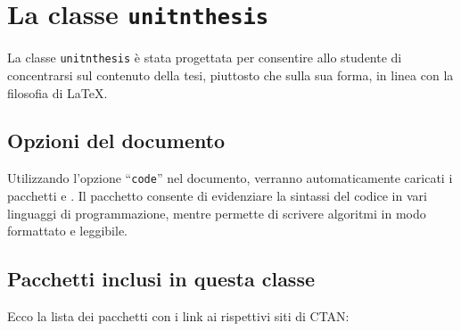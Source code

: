 \chapter{La classe \texttt{unitnthesis}}

La classe \texttt{unitnthesis} è stata progettata per consentire allo studente di concentrarsi sul contenuto della tesi, piuttosto che sulla sua forma, in linea con la 
filosofia di \LaTeX.

\section{Opzioni del documento}

Utilizzando l'opzione \enquote{\texttt{code}} nel documento, verranno automaticamente caricati i pacchetti  e . Il pacchetto  consente di evidenziare la sintassi del codice in vari linguaggi di programmazione, mentre  permette di scrivere algoritmi in modo formattato e leggibile.

\section{Pacchetti inclusi in questa classe}

Ecco la lista dei pacchetti con i link ai rispettivi siti di CTAN:

